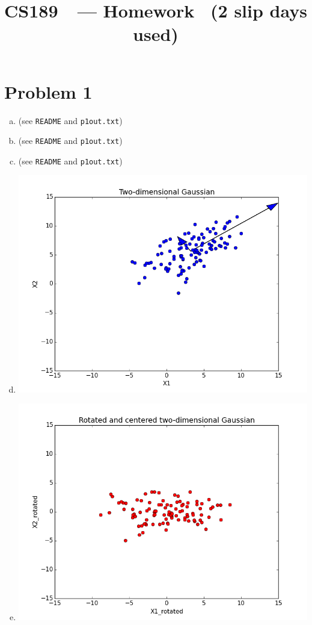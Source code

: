 \documentclass[11pt]{article}
\title{CS189\ \Session\  --- Homework \Homework\ (2 slip days used)}
\author{\Name}
\begin{document}
\maketitle
{}
\setcounter{problemnumber}{0}

\section*{Problem 1}
\begin{enumerate}[(a)]
\item (see \texttt{README} and \texttt{p1out.txt})
\item (see \texttt{README} and \texttt{p1out.txt})
\item (see \texttt{README} and \texttt{p1out.txt})
\item \includegraphics[scale=0.45]{images/p1d}
\item \includegraphics[scale=0.45]{images/p1e}
\end{enumerate}
\end{document}
